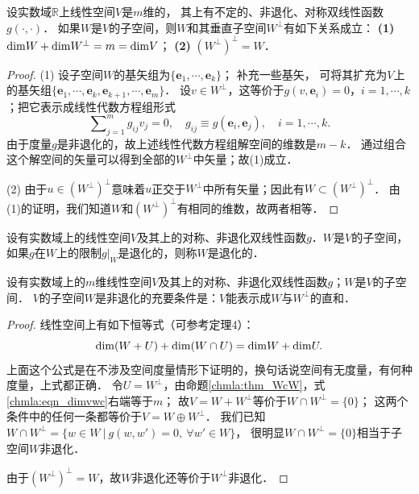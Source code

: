 \begin{proposition}\label{chmla:thm_WcW}
    设实数域$\mathbb{R}$上线性空间$V$是$m$维的，
    其上有不定的、非退化、对称双线性函数$g(\cdot,\cdot)$．
    如果$W$是$V$的子空间，则$W$和其{\kaishu 垂直子空间}$W^\perp$有如下关系成立：
    {\bfseries (1)} ${\rm dim} W + {\rm dim} W^\perp =m= {\rm dim} V$；
    {\bfseries (2)} $(W^\perp)^\perp = W$．
\end{proposition}
\begin{proof}
    (1) 设子空间$W$的基矢组为$\{\boldsymbol{e}_1,\cdots,\boldsymbol{e}_k\}$； 补充一些基矢，
    可将其扩充为$V$上的基矢组$\{\boldsymbol{e}_1,\cdots,\boldsymbol{e}_k,  \boldsymbol{e}_{k+1},\cdots,\boldsymbol{e}_m\}$．
    设$v\in W^\perp$，这等价于$g(v,\boldsymbol{e}_i)=0$，$i=1,\cdots,k$；把它表示成线性代数方程组形式
    \begin{equation}
        \sum\nolimits_{j=1}^{m} g_{ij} v_j =0 ,\quad 
        g_{ij}\equiv g(\boldsymbol{e}_i,\boldsymbol{e}_j),  \quad i=1,\cdots,k .
    \end{equation}
    由于度量$g$是非退化的，故上述线性代数方程组解空间的维数是$m-k$．
    通过组合这个解空间的矢量可以得到全部的$W^\perp$中矢量；故(1)成立．
    
    (2) 由于$u\in (W^\perp)^\perp$意味着$u$正交于$W^\perp$中所有矢量；因此有$W\subset (W^\perp)^\perp$．
    由(1)的证明，我们知道$W$和$(W^\perp)^\perp$有相同的维数，故两者相等．
\end{proof}


\begin{definition}\label{chmla:def_degenerate}
    设有实数域上的线性空间$V$及其上的对称、非退化双线性函数$g$．$W$是$V$的子空间，
    如果$g$在$W$上的限制$g|_W$是退化的，则称$W$是{\heiti 退化}的．
\end{definition}



\begin{proposition}\label{chmla:thm_wdwp}
    设有实数域上的$m$维线性空间$V$及其上的对称、非退化双线性函数$g$；$W$是$V$的子空间．
    $V$的子空间$W$是非退化的充要条件是：$V$能表示成$W$与$W^\perp$的直和．
\end{proposition}
\begin{proof}
    线性空间上有如下恒等式（可参考\parencite[p.184]{qiuws-2019-v2}定理4）：
    \begin{equation}\label{chmla:eqn_dimvwc}
        {\rm dim}(W+U) + {\rm dim}(W\cap U) = {\rm dim} W + {\rm dim} U .
    \end{equation}
    上面这个公式是在不涉及空间度量情形下证明的，换句话说空间有无度量，有何种度量，上式都正确．
    令$U=W^\perp$，由命题\ref{chmla:thm_WcW}，式\eqref{chmla:eqn_dimvwc}右端等于$m$；
    故$V=W+ W^\perp$等价于$W\cap W^\perp=\{0\}$；
    这两个条件中的任何一条都等价于$V=W\oplus W^\perp$．
    我们已知$W\cap W^\perp=\{w\in W \ |\ g(w,w')=0,\ \forall w'\in W \}$，
    很明显$W\cap W^\perp=\{0\}$相当于子空间$W$非退化．
    
    由于$(W^\perp)^\perp=W$，故$W$非退化还等价于$W^\perp$非退化．
\end{proof}



